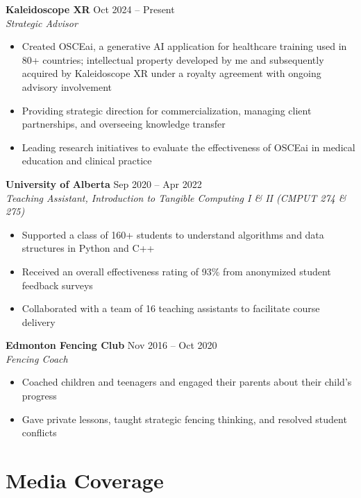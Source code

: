 \documentclass{article}
\begin{document}
\textbf{Kaleidoscope XR} \hfill Oct 2024 -- Present \\
\textit{Strategic Advisor}
\begin{itemize}
    \item Created OSCEai, a generative AI application for healthcare training used in 80+ countries; intellectual property developed by me and subsequently acquired by Kaleidoscope XR under a royalty agreement with ongoing advisory involvement
    \item Providing strategic direction for commercialization, managing client partnerships, and overseeing knowledge transfer
    \item Leading research initiatives to evaluate the effectiveness of OSCEai in medical education and clinical practice
\end{itemize} \vspace{1em}

\textbf{University of Alberta} \hfill Sep 2020 -- Apr 2022 \\
\textit{Teaching Assistant, Introduction to Tangible Computing I \& II (CMPUT 274 \& 275)}
\begin{itemize}
    \item Supported a class of 160+ students to understand algorithms and data structures in Python and C++
    \item Received an overall effectiveness rating of 93\% from anonymized student feedback surveys
    \item Collaborated with a team of 16 teaching assistants to facilitate course delivery
\end{itemize} \vspace{1em}

\textbf{Edmonton Fencing Club} \hfill Nov 2016 -- Oct 2020 \\
\textit{Fencing Coach}
\begin{itemize}
    \item Coached children and teenagers and engaged their parents about their child's progress
    \item Gave private lessons, taught strategic fencing thinking, and resolved student conflicts
\end{itemize}


\section*{\textcolor{my_colour}{Media Coverage}}
\vspace{-.25em} \hrulefill \vspace{.25em}
\end{document}
